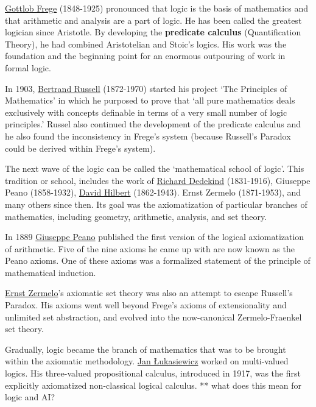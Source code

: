 \documentclass[]{book}
\theoremstyle{definition}
\theoremstyle{definition}
\theoremstyle{definition}
\theoremstyle{remark}
\begin{document}
\href{https://en.wikipedia.org/wiki/Gottlob_Frege}{Gottlob Frege}
(1848-1925) pronounced that logic is the basis of mathematics and that
arithmetic and analysis are a part of logic. He has been called the
greatest logician since Aristotle. By developing the \textbf{predicate
calculus} (Quantification Theory), he had combined Aristotelian and
Stoic's logics. His work was the foundation and the beginning point for
an enormous outpouring of work in formal logic.

In 1903, \href{https://en.wikipedia.org/wiki/Bertrand_Russell}{Bertrand
Russell} (1872-1970) started his project `The Principles of Mathematics'
in which he purposed to prove that `all pure mathematics deals
exclusively with concepts definable in terms of a very small number of
logic principles.' Russel also continued the development of the
predicate calculus and he also found the inconsistency in Frege's system
(because Russell's Paradox could be derived within Frege's system).

The next wave of the logic can be called the `mathematical school of
logic'. This tradition or school, includes the work of
\href{https://en.wikipedia.org/wiki/Richard_Dedekind}{Richard Dedekind}
(1831-1916), Giuseppe Peano (1858-1932),
\href{https://en.wikipedia.org/wiki/David_Hilbert}{David Hilbert}
(1862-1943). Ernst Zermelo (1871-1953), and many others since then. Its
goal was the axiomatization of particular branches of mathematics,
including geometry, arithmetic, analysis, and set theory.

In 1889 \href{https://en.wikipedia.org/wiki/Giuseppe_Peano}{Giuseppe
Peano} published the first version of the logical axiomatization of
arithmetic. Five of the nine axioms he came up with are now known as the
Peano axioms. One of these axioms was a formalized statement of the
principle of mathematical induction.

\href{https://en.wikipedia.org/wiki/Ernst_Zermelo}{Ernst Zermelo}'s
axiomatic set theory was also an attempt to escape Russell's Paradox.
His axioms went well beyond Frege's axioms of extensionality and
unlimited set abstraction, and evolved into the now-canonical
Zermelo-Fraenkel set theory.

Gradually, logic became the branch of mathematics that was to be brought
within the axiomatic methodology.
\href{https://en.wikipedia.org/wiki/Jan_\%C5\%81ukasiewicz}{Jan
Łukasiewicz} worked on multi-valued logics. His three-valued
propositional calculus, introduced in 1917, was the first explicitly
axiomatized non-classical logical calculus. ** what does this mean for
logic and AI?
\end{document}
